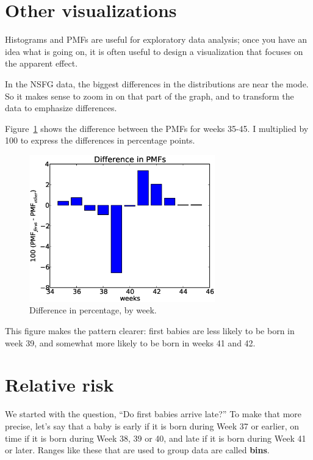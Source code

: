 \documentclass[12pt]{book}
\begin{document}


\section{Other visualizations}

Histograms and PMFs are useful for exploratory data analysis;
once you have an idea what is going on, it is often useful to
design a visualization that focuses on the apparent effect.


In the NSFG data, the biggest differences in the distributions are
near the mode.  So it makes sense to zoom in on that part of the
graph, and to transform the data to emphasize differences.


Figure~\ref{nsfg_diffs} shows the difference between the PMFs for weeks
35-45.  I multiplied by 100 to express the differences in percentage
points.

\begin{figure}
\centerline{\includegraphics[height=2.5in]{figs/nsfg_diffs.eps}}
\caption{Difference in percentage, by week.}
\label{nsfg_diffs}
\end{figure}

This figure makes the pattern clearer: first babies are
less likely to be born in week 39, and somewhat more likely
to be born in weeks 41 and 42.


\section{Relative risk}
\label{relative.risk}

We started with the question, ``Do first babies arrive late?''  To
make that more precise, let's say that a baby is early if it is born
during Week 37 or earlier, on time if it is born during Week 38, 39 or
40, and late if it is born during Week 41 or later.  Ranges like these
that are used to group data are called {\bf bins}.
\end{document}
